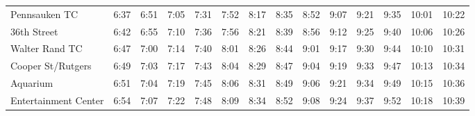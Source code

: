 \begin{center}
\begin{tabular}{@{}lrrrrrrrrrrrrr@{}}
Pennsauken TC & 6:37 & 6:51 & 7:05 & 7:31 & 7:52 & 8:17 & 8:35 & 8:52 & 9:07 & 9:21 & 9:35 & 10:01 & 10:22 \\
36th Street & 6:42 & 6:55 & 7:10 & 7:36 & 7:56 & 8:21 & 8:39 & 8:56 & 9:12 & 9:25 & 9:40 & 10:06 & 10:26 \\
Walter Rand TC & 6:47 & 7:00 & 7:14 & 7:40 & 8:01 & 8:26 & 8:44 & 9:01 & 9:17 & 9:30 & 9:44 & 10:10 & 10:31 \\
Cooper St/Rutgers & 6:49 & 7:03 & 7:17 & 7:43 & 8:04 & 8:29 & 8:47 & 9:04 & 9:19 & 9:33 & 9:47 & 10:13 & 10:34 \\
Aquarium & 6:51 & 7:04 & 7:19 & 7:45 & 8:06 & 8:31 & 8:49 & 9:06 & 9:21 & 9:34 & 9:49 & 10:15 & 10:36 \\
Entertainment Center & 6:54 & 7:07 & 7:22 & 7:48 & 8:09 & 8:34 & 8:52 & 9:08 & 9:24 & 9:37 & 9:52 & 10:18 & 10:39 \\
\bottomrule\end{tabular}\end{center}
